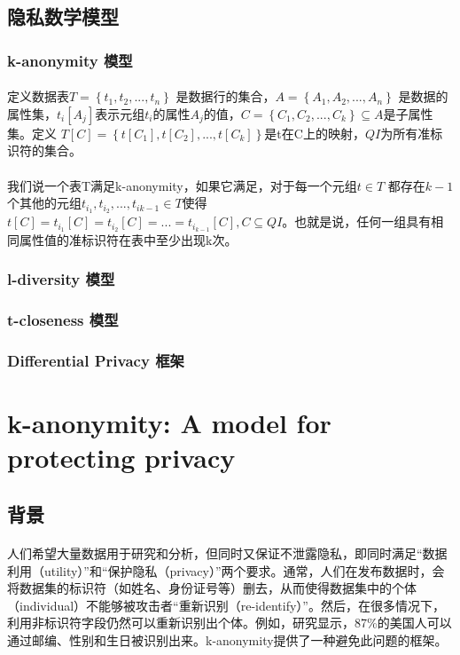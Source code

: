 \documentclass[12pt,a4paper]{article}
\begin{document}
\subsection{隐私数学模型}

	\subsubsection{k-anonymity 模型}
	\paragraph{} 定义数据表$T=\left \{ t_1, t_2,...,t_n \right \}$ 是数据行的集合，$A=\left \{ A_1, A_2,...,A_n \right \}$ 是数据的属性集，$t_i[A_j]$表示元组$t_i$的属性$A_j$的值，$C=\left \{ C_1,C_2,...,C_k \right \} \subseteq A $是子属性集。定义 $T[C] = \left \{ t[C_1],t[C_2],...,t[C_k] \right \}$是t在C上的映射，$QI$为所有准标识符的集合。
	\paragraph{} 我们说一个表T满足k-anonymity，如果它满足，对于每一个元组$t \in T $ 都存在$k-1$个其他的元组$t_{i_1},t_{i_2},...,t_{i{k-1}} \in T $使得 $t[C]=t_{i_1}[C]=t_{i_2}[C]=...=t_{i_{k-1}}[C], C \subseteq QI$。也就是说，任何一组具有相同属性值的准标识符在表中至少出现k次。
	\subsubsection{l-diversity 模型}
	\subsubsection{t-closeness 模型}
	\subsubsection{Differential Privacy 框架}


\section{k-anonymity: A model for protecting privacy \cite{k-anonymity}}

\subsection{背景}
\paragraph{} 人们希望大量数据用于研究和分析，但同时又保证不泄露隐私，即同时满足“数据利用（utility）”和“保护隐私（privacy）”两个要求。通常，人们在发布数据时，会将数据集的标识符（如姓名、身份证号等）删去，从而使得数据集中的个体（individual）不能够被攻击者“重新识别（re-identify）”。然后，在很多情况下，利用非标识符字段仍然可以重新识别出个体。例如，研究显示，87\%的美国人可以通过邮编、性别和生日被识别出来。k-anonymity提供了一种避免此问题的框架。
\end{document}
